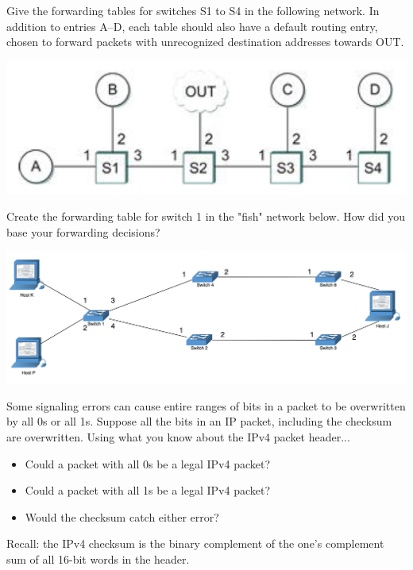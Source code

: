 \documentclass[12pt,addpoints,answers]{exam}
\begin{document}
\begin{questions}
\question[6] Give the forwarding tables for switches S1 to S4 in the following network. In addition to entries A--D, each table should also have a default routing entry, chosen to forward packets with unrecognized destination addresses towards OUT.
\begin{center}
\includegraphics[width=0.6\linewidth]{fig/simple.png}
\end{center}
\begin{solution}
\end{solution}

\question[6] Create the forwarding table for switch 1 in the "fish" network below. How did you base your forwarding decisions?
\begin{center}
\includegraphics[width=1.0\linewidth]{fig/fish.png}
\end{center}
\begin{solution}
\end{solution}

\question[4] Some signaling errors can cause entire ranges of bits in a packet to be overwritten by all 0s or all 1s. Suppose all the bits in an IP packet, including the checksum are overwritten. Using what you know about the IPv4 packet header...
\begin{itemize}
\item Could a packet with all 0s be a legal IPv4 packet?
\item Could a packet with all 1s be a legal IPv4 packet?
\item Would the checksum catch either error?
\end{itemize}
Recall: the IPv4 checksum is the binary complement of the one's complement sum of all 16-bit words in the header.
\begin{solution}
\end{solution}


\end{questions}
\end{document}
